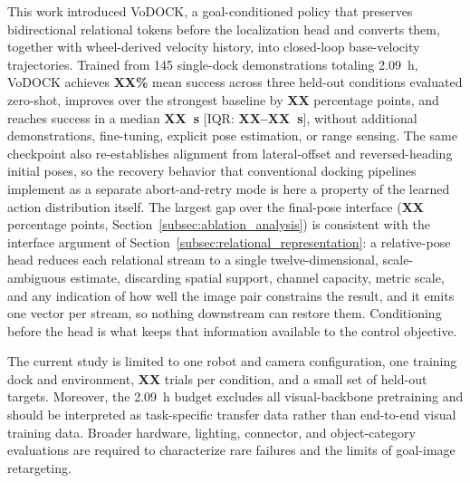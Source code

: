\documentclass[letterpaper, 10 pt, conference]{IEEEtran}  %
\begin{document}
This work introduced VoDOCK, a goal-conditioned policy that preserves bidirectional relational tokens before the localization head and converts them, together with wheel-derived velocity history, into closed-loop base-velocity trajectories. Trained from 145 single-dock demonstrations totaling 2.09~h, VoDOCK achieves \textbf{XX\%} mean success across three held-out conditions evaluated zero-shot, improves over the strongest baseline by \textbf{XX} percentage points, and reaches success in a median \textbf{XX~s} [IQR: \textbf{XX--XX~s}], without additional demonstrations, fine-tuning, explicit pose estimation, or range sensing. The same checkpoint also re-establishes alignment from lateral-offset and reversed-heading initial poses, so the recovery behavior that conventional docking pipelines implement as a separate abort-and-retry mode is here a property of the learned action distribution itself. The largest gap over the final-pose interface (\textbf{XX} percentage points, Section~\ref{subsec:ablation_analysis}) is consistent with the interface argument of Section~\ref{subsec:relational_representation}: a relative-pose head reduces each relational stream to a single twelve-dimensional, scale-ambiguous estimate, discarding spatial support, channel capacity, metric scale, and any indication of how well the image pair constrains the result, and it emits one vector per stream, so nothing downstream can restore them. Conditioning before the head is what keeps that information available to the control objective.

The current study is limited to one robot and camera configuration, one training dock and environment, \textbf{XX} trials per condition, and a small set of held-out targets. Moreover, the 2.09~h budget excludes all visual-backbone pretraining and should be interpreted as task-specific transfer data rather than end-to-end visual training data. Broader hardware, lighting, connector, and object-category evaluations are required to characterize rare failures and the limits of goal-image retargeting.
\end{document}
